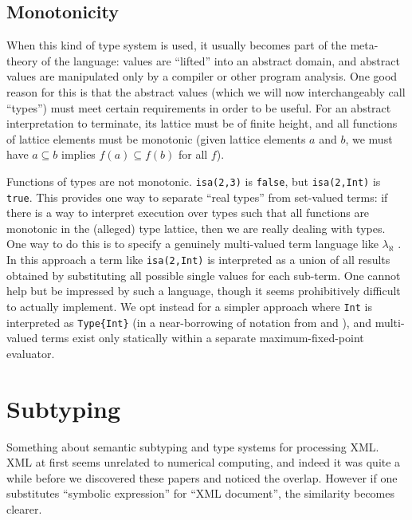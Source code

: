 \subsection{Monotonicity}

When this kind of type system is used, it usually becomes part of the
meta-theory of the language: values are ``lifted'' into an abstract
domain, and abstract values are manipulated only by a compiler
or other program analysis.
One good reason for this is that the abstract values (which we will
now interchangeably call ``types'') must meet certain requirements in
order to be useful.
For an abstract interpretation to terminate, its lattice must be of
finite height, and all functions of lattice elements must be
monotonic (given lattice elements $a$ and $b$, we must have
$a\subseteq b$ implies $f(a)\subseteq f(b)$ for all $f$).


Functions of types are not monotonic. \texttt{isa(2,3)} is \texttt{false},
but \texttt{isa(2,Int)} is \texttt{true}.
This provides one way to separate ``real types'' from set-valued terms:
if there is a way to interpret execution over types such that all functions
are monotonic in the (alleged) type lattice, then we are really dealing
with types.
One way to do this is to specify a genuinely multi-valued term language
like $\lambda_\aleph$ \cite{Glew:2013:MLD:2502409.2502412}.
In this approach a term like \texttt{isa(2,Int)} is interpreted as a
union of all results obtained by substituting all possible single values
for each sub-term. One cannot help but be impressed by such a language,
though it seems prohibitively difficult to actually implement.
We opt instead for a simpler approach where \texttt{Int} is
interpreted as \texttt{Type\{Int\}} (in a near-borrowing of notation from
\cite{cardelli1986polymorphic} and \cite{Glew:2013:MLD:2502409.2502412}),
and multi-valued terms exist only statically within a separate
maximum-fixed-point evaluator.

\section{Subtyping}

Something about semantic subtyping and type systems for processing XML.
XML at first seems unrelated to numerical computing, and indeed it
was quite a while before we discovered these papers and noticed the
overlap. However if one substitutes ``symbolic expression'' for
``XML document'', the similarity becomes clearer.

